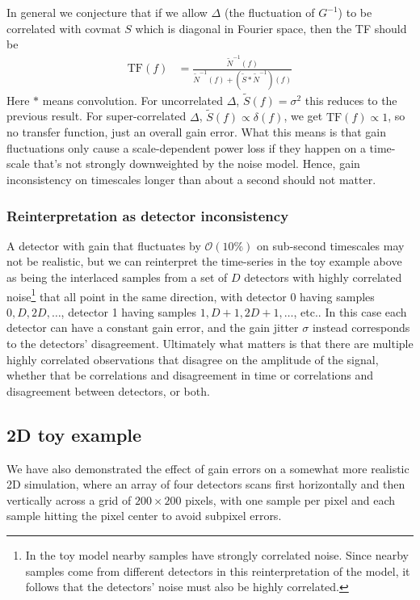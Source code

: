\documentclass[twocolumn,apj]{aastex63}
\begin{document}
In general we conjecture that if we allow $\Delta$ (the fluctuation of $G^{-1}$)
to be correlated with covmat $S$ which is diagonal in Fourier space, then the TF should be
\begin{align}
\text{TF}(f) &= \frac{\widetilde{N}^{-1}(f)}{\widetilde{N}^{-1}(f) + (\widetilde{S} \ast \widetilde{N}^{-1})(f)}
\end{align}
Here $\ast$ means convolution. For uncorrelated $\Delta$, $\widetilde S(f) = \sigma^2$
this reduces to the previous result.
For super-correlated $\Delta$, $\widetilde S(f) \propto \delta(f)$, we get $\text{TF}(f) \propto 1$,
so no transfer function, just an overall gain error. What this means is that gain fluctuations
only cause a scale-dependent power loss if they happen on a time-scale that's not strongly
downweighted by the noise model. Hence, gain inconsistency on timescales longer than about a
second should not matter.

\subsubsection{Reinterpretation as detector inconsistency}
A detector with gain that fluctuates by $\mathcal{O}(10\%)$ on sub-second timescales may not be
realistic, but we can reinterpret the time-series in the toy example above as being the interlaced
samples from a set of $D$ detectors with highly correlated noise\footnote{
In the toy model nearby samples have strongly correlated noise. Since nearby samples come from
different detectors in this reinterpretation of the model, it follows that the detectors' noise
must also be highly correlated.
} that all point in the same direction, with detector 0 having
samples $0,D,2D,\ldots$, detector 1 having samples $1,D+1,2D+1,\ldots$, etc.. In this case each detector
can have a constant gain error, and the gain jitter $\sigma$ instead corresponds to the detectors'
disagreement. Ultimately what matters is that there are multiple highly correlated observations
that disagree on the amplitude of the signal, whether that be correlations and disagreement in
time or correlations and disagreement between detectors, or both.

\subsection{2D toy example}
We have also demonstrated the effect of gain errors on a somewhat more realistic
2D simulation, where an array of four detectors scans first horizontally and then vertically
across a grid of $200\times200$ pixels, with one sample per pixel and each sample
hitting the pixel center to avoid subpixel errors.
\end{document}

